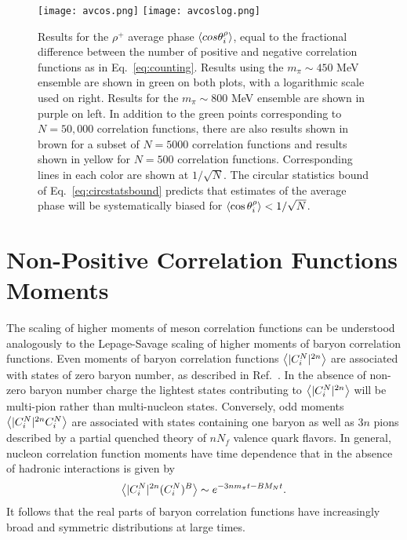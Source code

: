 \begin{figure}[!t] \centering
  \texttt{[image: avcos.png]} \hspace{10pt}
  \texttt{[image: avcoslog.png]}
  \caption{Results for the $\rho^+$ average phase $\left< cos \theta_i^\rho \right>$, equal to the fractional difference between the number of positive and negative correlation functions as in Eq.~\eqref{eq:counting}. Results using the $m_\pi\sim 450$ MeV ensemble are shown in green on both plots, with a logarithmic scale used on right. Results for the $m_\pi \sim 800$ MeV ensemble are shown in purple on left. In addition to the green points corresponding to $N= 50,000$ correlation functions, there are also results shown in brown for a subset of $N=5000$ correlation functions and results shown in yellow for $N=500$ correlation functions. Corresponding lines in each color are shown at $1/\sqrt{N}$. The circular statistics bound of Eq.~\eqref{eq:circstatsbound} predicts that estimates of the average phase will be systematically biased for $\left< \cos \theta_i^\rho \right> < 1/\sqrt{N}$.
    } 
  \label{fig:RhoThCirc}
\end{figure}


\section{Non-Positive Correlation Functions Moments}

The scaling of higher moments of meson correlation functions can be understood analogously to the Lepage-Savage scaling of higher moments of baryon correlation functions.
Even moments of baryon correlation functions $\left< |C_i^N|^{2n} \right>$ are associated with states of zero baryon number, as described in Ref.~\cite{Beane:2014oea}.
In the absence of non-zero baryon number charge the lightest states contributing to $\left< |C_i^N|^{2n} \right>$ will be multi-pion rather than multi-nucleon states. 
Conversely, odd moments $\left< |C_i^N|^{2n}C_i^N \right>$ are associated with states containing one baryon as well as $3n$ pions described by a partial quenched theory of $nN_f$ valence quark flavors.
In general, nucleon correlation function moments have time dependence that in the absence of hadronic interactions is given by
\begin{equation}
  \begin{split}
    \left< |C_i^N|^{2n} (C_i^N)^B \right> \sim e^{-3n m_\pi t - B M_N t}.
  \end{split}\label{eq:baryonLS}
\end{equation}
It follows that the real parts of baryon correlation functions have increasingly broad and symmetric distributions at large times.

